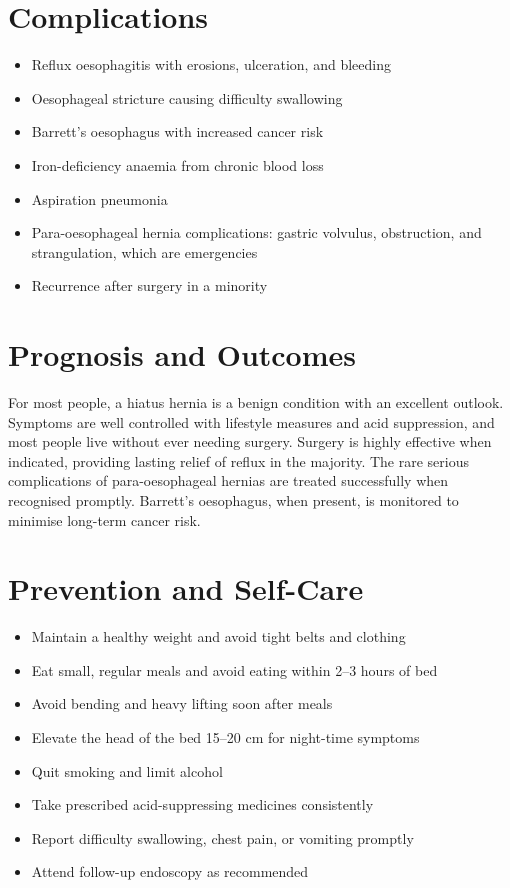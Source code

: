 \section*{Complications}
\begin{itemize}
    \item Reflux oesophagitis with erosions, ulceration, and bleeding
    \item Oesophageal stricture causing difficulty swallowing
    \item Barrett's oesophagus with increased cancer risk
    \item Iron-deficiency anaemia from chronic blood loss
    \item Aspiration pneumonia
    \item Para-oesophageal hernia complications: gastric volvulus, obstruction, and strangulation, which are emergencies
    \item Recurrence after surgery in a minority
\end{itemize}

\section*{Prognosis and Outcomes}
For most people, a hiatus hernia is a benign condition with an excellent outlook. Symptoms are well controlled with lifestyle measures and acid suppression, and most people live without ever needing surgery. Surgery is highly effective when indicated, providing lasting relief of reflux in the majority. The rare serious complications of para-oesophageal hernias are treated successfully when recognised promptly. Barrett's oesophagus, when present, is monitored to minimise long-term cancer risk.

\section*{Prevention and Self-Care}
\begin{itemize}
    \item Maintain a healthy weight and avoid tight belts and clothing
    \item Eat small, regular meals and avoid eating within 2--3 hours of bed
    \item Avoid bending and heavy lifting soon after meals
    \item Elevate the head of the bed 15--20 cm for night-time symptoms
    \item Quit smoking and limit alcohol
    \item Take prescribed acid-suppressing medicines consistently
    \item Report difficulty swallowing, chest pain, or vomiting promptly
    \item Attend follow-up endoscopy as recommended
\end{itemize}

